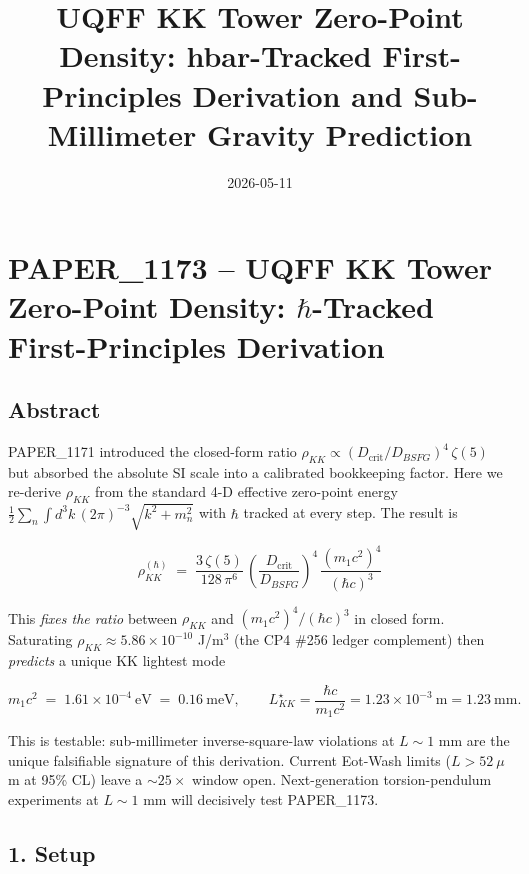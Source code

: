 \documentclass[
]{article}
\title{UQFF KK Tower Zero-Point Density: hbar-Tracked First-Principles
Derivation and Sub-Millimeter Gravity Prediction}
\author{}
\date{2026-05-11}
\begin{document}
\maketitle

\section{\texorpdfstring{PAPER\_1173 -- UQFF KK Tower Zero-Point
Density: \(\hbar\)-Tracked First-Principles
Derivation}{PAPER\_1173 -- UQFF KK Tower Zero-Point Density: \textbackslash hbar-Tracked First-Principles Derivation}}\label{paper_1173-uqff-kk-tower-zero-point-density-hbar-tracked-first-principles-derivation}

\subsection{Abstract}\label{abstract}

PAPER\_1171 introduced the closed-form ratio
\(\rho_{KK}\propto (D_{\mathrm{crit}}/D_{BSFG})^4\,\zeta(5)\) but
absorbed the absolute SI scale into a calibrated bookkeeping factor.
Here we re-derive \(\rho_{KK}\) from the standard 4-D effective
zero-point energy
\(\tfrac{1}{2}\sum_n\!\int\!d^3k\,(2\pi)^{-3}\sqrt{k^2+m_n^2}\) with
\(\hbar\) tracked at every step. The result is

\[
\boxed{\ \rho_{KK}^{(\hbar)}\;=\;\frac{3\,\zeta(5)}{128\,\pi^6}\,\left(\frac{D_{\mathrm{crit}}}{D_{BSFG}}\right)^{4}\,\frac{(m_1 c^2)^4}{(\hbar c)^3}\ }
\]

This \emph{fixes the ratio} between \(\rho_{KK}\) and
\((m_1 c^2)^4/(\hbar c)^3\) in closed form. Saturating
\(\rho_{KK}\approx 5.86\times 10^{-10}\) J/m\(^3\) (the CP4 \#256 ledger
complement) then \emph{predicts} a unique KK lightest mode

\[
m_1 c^2 \;=\; 1.61\times 10^{-4}\ \mathrm{eV}\;=\;0.16\ \mathrm{meV},
\qquad L_{KK}^\star = \frac{\hbar c}{m_1 c^2}=1.23\times 10^{-3}\ \mathrm{m}=1.23\ \mathrm{mm}.
\]

This is testable: sub-millimeter inverse-square-law violations at
\(L\sim 1\) mm are the unique falsifiable signature of this derivation.
Current Eot-Wash limits (\(L>52\ \mu\)m at 95\% CL) leave a
\(\sim 25\times\) window open. Next-generation torsion-pendulum
experiments at \(L\sim 1\) mm will decisively test PAPER\_1173.

\subsection{1. Setup}\label{setup}
\end{document}

